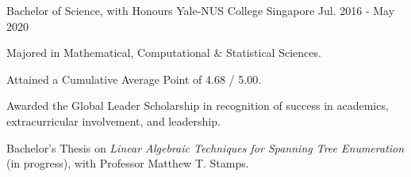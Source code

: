 

\begin{cventries}

  \cventry
    {Bachelor of Science, with Honours} %
    {Yale-NUS College} %
    {Singapore} %
    {Jul. 2016 - May 2020} %
    {
      \begin{cvitems} %
      \item {Majored in Mathematical, Computational \& Statistical Sciences.}
      \item {Attained a Cumulative Average Point of 4.68 / 5.00.}
      \item {Awarded the Global Leader Scholarship in recognition of success in
          academics, extracurricular involvement, and leadership.}
      \item {Bachelor's Thesis on \textit{Linear Algebraic Techniques for Spanning Tree
          Enumeration} (in progress), with Professor Matthew T. Stamps.}
      \end{cvitems}
    }

\end{cventries}

